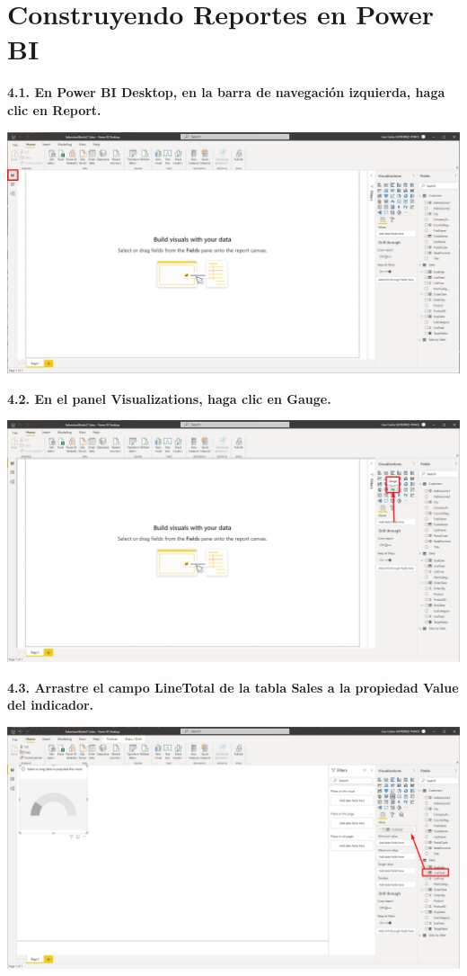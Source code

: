 \documentclass{article}
\begin{document}
\newpage


\section{Construyendo Reportes en Power BI}

\textbf{4.1. En \textbf{Power BI Desktop}, en la barra de navegación izquierda, haga clic en \textbf{Report}.}

    \begin{center}
		\includegraphics[width=14cm]{./images/77} 
	\end{center}

\textbf{4.2. En el panel \textbf{Visualizations}, haga clic en \textbf{Gauge}.}

    \begin{center}
		\includegraphics[width=14cm]{./images/78} 
	\end{center}


\textbf{4.3. Arrastre el campo \textbf{LineTotal} de la tabla \textbf{Sales} a la propiedad \textbf{Value} del indicador.}

    \begin{center}
		\includegraphics[width=14cm]{./images/79} 
	\end{center}
\end{document}
